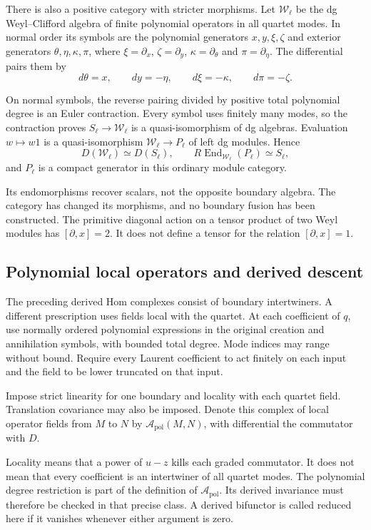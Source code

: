 There is also a positive category with stricter morphisms.
Let $\mathcal W_\ell$ be the dg Weyl--Clifford algebra of
finite polynomial operators in all quartet modes. In
normal order its symbols are the polynomial generators
$x,y,\xi,\zeta$ and exterior generators
$\theta,\eta,\kappa,\pi$, where
$\xi=\partial_x$, $\zeta=\partial_y$,
$\kappa=\partial_\theta$ and $\pi=\partial_\eta$.
The differential pairs them by
\[
 d\theta=x,\qquad dy=-\eta,
 \qquad d\xi=-\kappa,
 \qquad d\pi=-\zeta.
\]

On normal symbols, the reverse pairing divided by positive
total polynomial degree is an Euler contraction. Every
symbol uses finitely many modes, so the contraction proves
$S_\ell\to\mathcal W_\ell$ is a quasi-isomorphism of dg
algebras. Evaluation $w\mapsto w1$ is a quasi-isomorphism
$\mathcal W_\ell\to P_\ell$ of left dg modules. Hence
\[
 D(\mathcal W_\ell)\simeq D(S_\ell),\qquad
 R\operatorname{End}_{\mathcal W_\ell}(P_\ell)\simeq S_\ell,
\]
and $P_\ell$ is a compact generator in this ordinary
module category.

Its endomorphisms recover scalars, not
the opposite boundary algebra. The category has changed
its morphisms, and no boundary fusion has been constructed.
The primitive diagonal action on a tensor product of two
Weyl modules has $[\partial,x]=2$. It does not define a
tensor for the relation $[\partial,x]=1$.

\subsection{Polynomial local operators and derived descent}

The preceding derived Hom complexes consist of boundary
intertwiners. A different prescription uses fields local
with the quartet. At each coefficient of $q$, use normally
ordered polynomial expressions in the original creation
and annihilation symbols, with bounded total degree.
Mode indices may range without bound. Require every
Laurent coefficient to act finitely on each input and
the field to be lower truncated on that input.

Impose strict linearity for one boundary and locality with
each quartet field. Translation covariance may also
be imposed. Denote this complex of local operator fields
from $M$ to $N$ by $\mathcal A_{\mathrm{pol}}(M,N)$,
with differential the commutator with $D$.

Locality means that a power of $u-z$ kills each graded
commutator. It does not mean that every coefficient is
an intertwiner of all quartet modes. The polynomial
degree restriction is part of the definition of
$\mathcal A_{\mathrm{pol}}$. Its derived invariance
must therefore be checked in that precise class.
A derived bifunctor is called reduced here if it
vanishes whenever either argument is zero.

